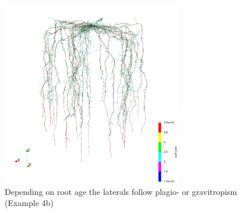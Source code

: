 \begin{figure}
\centering
\includegraphics[width=0.7\textwidth]{example4b.png}
\caption{Depending on root age the laterals follow plagio- or gravitropism (Example 4b)} \label{fig:tropism}
\end{figure}

